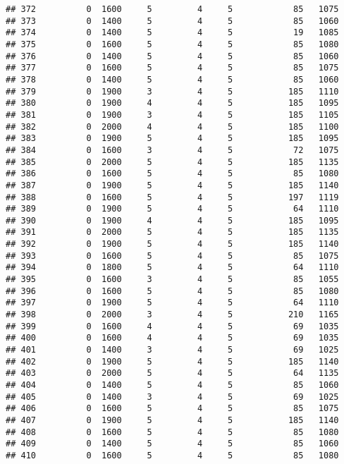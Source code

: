 \documentclass[]{article}
\begin{document}
\begin{verbatim}
## 372          0  1600     5         4     5            85   1075
## 373          0  1400     5         4     5            85   1060
## 374          0  1400     5         4     5            19   1085
## 375          0  1600     5         4     5            85   1080
## 376          0  1400     5         4     5            85   1060
## 377          0  1600     5         4     5            85   1075
## 378          0  1400     5         4     5            85   1060
## 379          0  1900     3         4     5           185   1110
## 380          0  1900     4         4     5           185   1095
## 381          0  1900     3         4     5           185   1105
## 382          0  2000     4         4     5           185   1100
## 383          0  1900     5         4     5           185   1095
## 384          0  1600     3         4     5            72   1075
## 385          0  2000     5         4     5           185   1135
## 386          0  1600     5         4     5            85   1080
## 387          0  1900     5         4     5           185   1140
## 388          0  1600     5         4     5           197   1119
## 389          0  1900     5         4     5            64   1110
## 390          0  1900     4         4     5           185   1095
## 391          0  2000     5         4     5           185   1135
## 392          0  1900     5         4     5           185   1140
## 393          0  1600     5         4     5            85   1075
## 394          0  1800     5         4     5            64   1110
## 395          0  1600     3         4     5            85   1055
## 396          0  1600     5         4     5            85   1080
## 397          0  1900     5         4     5            64   1110
## 398          0  2000     3         4     5           210   1165
## 399          0  1600     4         4     5            69   1035
## 400          0  1600     4         4     5            69   1035
## 401          0  1400     3         4     5            69   1025
## 402          0  1900     5         4     5           185   1140
## 403          0  2000     5         4     5            64   1135
## 404          0  1400     5         4     5            85   1060
## 405          0  1400     3         4     5            69   1025
## 406          0  1600     5         4     5            85   1075
## 407          0  1900     5         4     5           185   1140
## 408          0  1600     5         4     5            85   1080
## 409          0  1400     5         4     5            85   1060
## 410          0  1600     5         4     5            85   1080

\end{verbatim}
\end{document}
